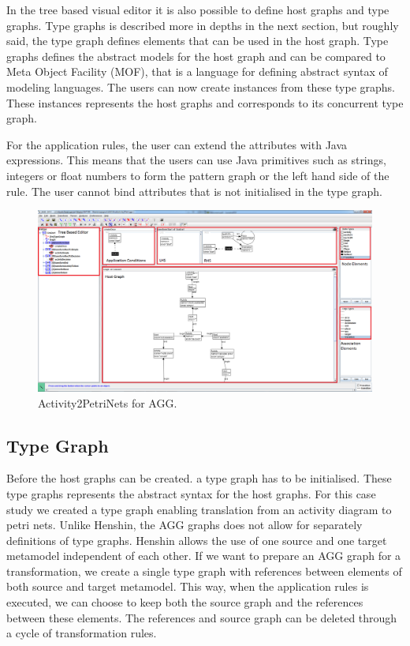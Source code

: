 \documentclass[pdftex,11pt,a4paper]{article}
\begin{document}
\indent In the tree based visual editor it is also possible to define host
graphs and type graphs. Type graphs is described more in depths in the next
section, but roughly said, the type graph defines elements that can be used in
the host graph. Type graphs defines the abstract models for the host graph and
can be compared to Meta Object Facility (MOF)\cite{MOF}, that is a language for
defining abstract syntax of modeling languages. The users can now create instances
from these type graphs. These instances represents the host graphs and
corresponds to its concurrent type graph. 

\indent For the application rules, the user can extend the attributes with Java
expressions. This means that the users can use Java primitives such as strings,
integers or float numbers to form the pattern graph or the left hand side of
the rule. The user cannot bind attributes that is not initialised in the type graph. 

\begin{figure}[H]
	\centering
	\includegraphics[scale=0.3]{figures/AGGscreen.png}
	\caption{Activity2PetriNets for AGG.}
	\label{fig:AGGScreen}
\end{figure}

\subsection{Type Graph}

\noindent Before the host graphs can be created. a type graph has to be
initialised. These type graphs represents the abstract syntax for the host
graphs. For this case study we created a type graph enabling translation from
an activity diagram to petri nets. Unlike Henshin, the AGG graphs does not
allow for separately definitions of type graphs. Henshin allows the use of one
source and one target metamodel independent of each other. If we want to
prepare an AGG graph for a transformation, we create a single type graph with
references between elements of both source and target metamodel. This way, when
the application rules is executed, we can choose to keep both the source graph
and the references between these elements. The references and source graph can
be deleted through a cycle of transformation rules.
\end{document}
